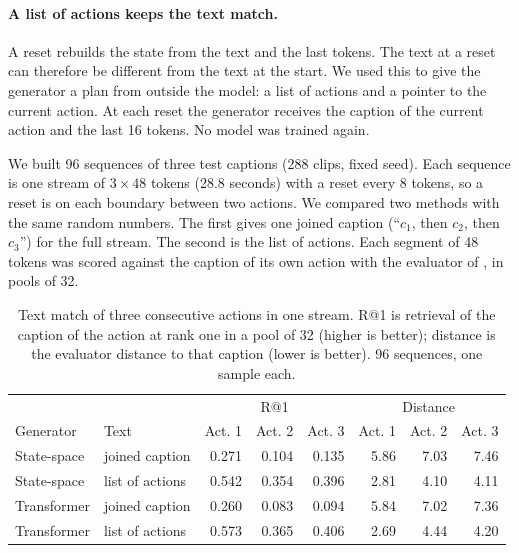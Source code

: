 \paragraph{A list of actions keeps the text match.} A reset rebuilds the state from the text and the last tokens. The text at a reset can therefore be different from the text at the start. We used this to give the generator a plan from outside the model: a list of actions and a pointer to the current action. At each reset the generator receives the caption of the current action and the last 16 tokens. No model was trained again.

We built 96 sequences of three test captions (288 clips, fixed seed). Each sequence is one stream of $3 \times 48$ tokens (28.8 seconds) with a reset every 8 tokens, so a reset is on each boundary between two actions. We compared two methods with the same random numbers. The first gives one joined caption (``$c_1$, then $c_2$, then $c_3$'') for the full stream. The second is the list of actions. Each segment of 48 tokens was scored against the caption of its own action with the evaluator of , in pools of 32.

\begin{table}[H]
\centering
\caption{Text match of three consecutive actions in one stream. R@1 is retrieval of the caption of the action at rank one in a pool of 32 (higher is better); distance is the evaluator distance to that caption (lower is better). 96 sequences, one sample each.}
\label{tab:action_list}
\begin{tabular}{llrrrrrr}
\toprule
 & & \multicolumn{3}{c}{R@1} & \multicolumn{3}{c}{Distance} \\
Generator & Text & Act. 1 & Act. 2 & Act. 3 & Act. 1 & Act. 2 & Act. 3 \\
\midrule
State-space & joined caption & 0.271 & 0.104 & 0.135 & 5.86 & 7.03 & 7.46 \\
State-space & list of actions & 0.542 & 0.354 & 0.396 & 2.81 & 4.10 & 4.11 \\
\midrule
Transformer & joined caption & 0.260 & 0.083 & 0.094 & 5.84 & 7.02 & 7.36 \\
Transformer & list of actions & 0.573 & 0.365 & 0.406 & 2.69 & 4.44 & 4.20 \\
\bottomrule
\end{tabular}
\end{table}


